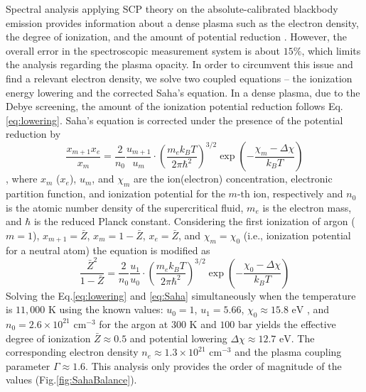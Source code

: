 Spectral analysis applying SCP theory on the absolute-calibrated blackbody emission provides information about a dense plasma such as the electron density, the degree of ionization, and the amount of potential reduction \cite{bataller2014blackbody}. However, the overall error in the spectroscopic measurement system is about $15\%$, which limits the analysis regarding the plasma opacity. In order to circumvent this issue and find a relevant electron density, we solve two coupled equations – the ionization energy lowering and the corrected Saha’s equation. In a dense plasma, due to the Debye screening, the amount of the ionization potential reduction follows Eq.\ref{eq:lowering}. Saha’s equation is corrected under the presence of the potential reduction by 
\begin{equation}
\frac{x_{m+1} x_{e}}{x_{m}}=\frac{2}{n_{0}} \frac{u_{m+1}}{u_{m}} \cdot\left(\frac{m_{e} k_{B} T}{2 \pi \hbar^{2}}\right)^{3 / 2} \exp \left(-\frac{\chi_{m}-\Delta \chi}{k_{B} T}\right)
\end{equation}
, where $x_m$ ($x_e$), $u_m$, and $χ_m$ are the ion(electron) concentration, electronic partition function, and ionization potential for the $m\text{-th}$ ion, respectively \cite{bataller2014blackbody, griem1962high, zel2002physics} and $n_0$ is the atomic number density of the supercritical fluid, $m_e$ is the electron mass, and $\hbar$ is the reduced Planck constant. Considering the first ionization of argon ($m=1$), $x_{m+1}=\bar{Z}$, $x_m=1-\bar{Z}$, $x_e=\bar{Z}$, and $\chi_m=\chi_0$ (i.e., ionization potential for a neutral atom) the equation is modified as 
\begin{equation}
\frac{\bar{Z}^{2}}{1-\bar{Z}}=\frac{2}{n_{0}} \frac{u_{1}}{u_{0}} \cdot\left(\frac{m_{e} k_{B} T}{2 \pi \hbar^{2}}\right)^{3 / 2} \exp \left(-\frac{\chi_{0}-\Delta \chi}{k_{B} T}\right)
\label{eq:Saha}
\end{equation}
Solving the Eq.\ref{eq:lowering} and \ref{eq:Saha} simultaneously when the temperature is $11,000 \text{ K}$ using the known values: $u_0=1$, $u_1=5.66$, $\chi_0 \approx 15.8 \text{ eV}$ \cite{kramida2020nist}, and $n_0 = 2.6 \times 10^{21}  \text{ cm}^{-3}$ for the argon at $300 \text{ K}$ and $100 \text{ bar}$ \cite{linstorm2020nist} yields the effective degree of ionization $\bar{Z} \approx 0.5$ and potential lowering $\Delta \chi \approx 12.7 \text{ eV}$. The corresponding electron density $n_e \approx 1.3 \times 10^{21} \text{ cm}^{-3}$ and the plasma coupling parameter $\Gamma \approx 1.6$. This analysis only provides the order of magnitude of the values (Fig.\ref{fig:SahaBalance}).




